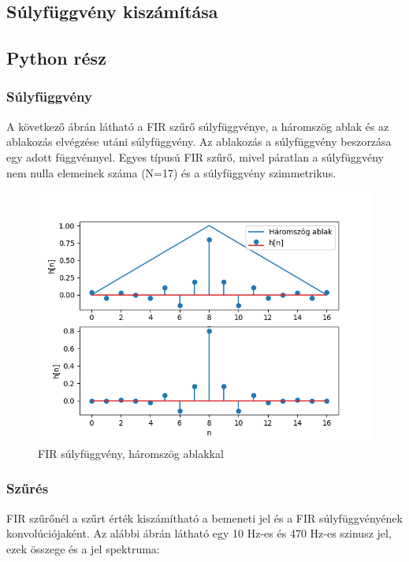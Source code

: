 \subsection{Súlyfüggvény kiszámítása}


\subsection{Python rész}

\subsubsection{Súlyfüggvény}

A következő ábrán látható a FIR szűrő súlyfüggvénye, a háromszög ablak és az ablakozás elvégzése utáni súlyfüggvény. Az ablakozás a súlyfüggvény beszorzása egy adott függvénnyel. Egyes típusú FIR szűrő, mivel páratlan a súlyfüggvény nem nulla elemeinek száma (N=17) és a súlyfüggvény szimmetrikus.

\begin{figure}[H]
    \centering
    \includegraphics[scale=0.5]{figures/h.png}
    \caption{FIR súlyfüggvény, háromszög ablakkal}
\end{figure}

\subsubsection{Szűrés}

FIR szűrőnél a szűrt érték kiszámítható a bemeneti jel és a FIR súlyfüggvényének konvolúciójaként. Az alábbi ábrán látható egy 10 Hz-es és 470 Hz-es szinusz jel, ezek összege és a jel spektruma:

